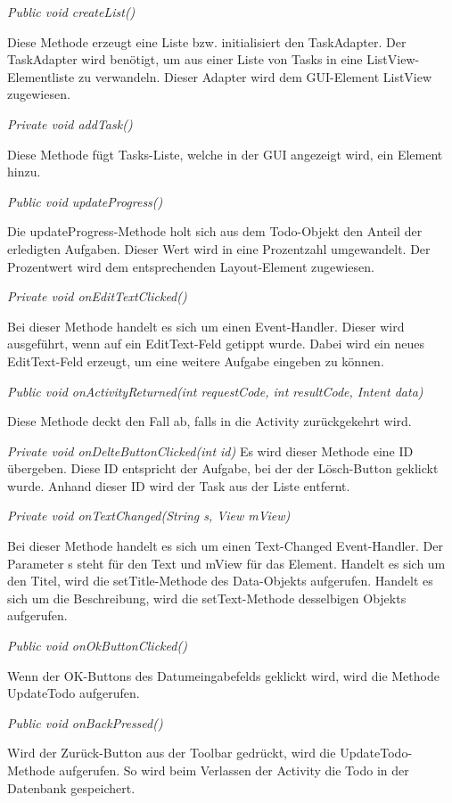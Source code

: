 \textit{Public void createList()}

Diese Methode erzeugt eine Liste bzw. initialisiert den TaskAdapter. Der TaskAdapter wird benötigt, um aus einer Liste von Tasks in eine ListView-Elementliste zu verwandeln. Dieser Adapter wird dem GUI-Element ListView zugewiesen.

\textit{Private void addTask()}

Diese Methode fügt Tasks-Liste, welche in der GUI angezeigt wird, ein Element hinzu.

\textit{Public void updateProgress()}

Die updateProgress-Methode holt sich aus dem Todo-Objekt den Anteil der erledigten Aufgaben. Dieser Wert wird in eine Prozentzahl umgewandelt. Der Prozentwert wird dem entsprechenden Layout-Element zugewiesen.

\textit{Private void onEditTextClicked()}

Bei dieser Methode handelt es sich um einen Event-Handler. Dieser wird ausgeführt, wenn auf ein EditText-Feld getippt wurde. Dabei wird ein neues EditText-Feld erzeugt, um eine weitere Aufgabe eingeben zu können.

\textit{Public void onActivityReturned(int requestCode, int resultCode, Intent data)}

	Diese Methode deckt den Fall ab, falls in die Activity zurückgekehrt wird.

\textit{Private void onDelteButtonClicked(int id)}
Es wird dieser Methode eine ID übergeben. Diese ID entspricht der Aufgabe, bei der der Lösch-Button geklickt wurde. Anhand dieser ID wird der Task aus der Liste entfernt.

\textit{Private void onTextChanged(String s, View mView)}

Bei dieser Methode handelt es sich um einen Text-Changed Event-Handler. Der Parameter s steht für den Text und mView für das Element. Handelt es sich um den Titel, wird die setTitle-Methode des Data-Objekts aufgerufen. Handelt es sich um die Beschreibung, wird die setText-Methode desselbigen Objekts aufgerufen.

\textit{Public void onOkButtonClicked()}

Wenn der OK-Buttons des Datumeingabefelds geklickt wird, wird die Methode UpdateTodo aufgerufen.

\textit{Public void onBackPressed()}

Wird der Zurück-Button aus der Toolbar gedrückt, wird die UpdateTodo-Methode aufgerufen. So wird beim Verlassen der Activity die Todo in der Datenbank gespeichert.

